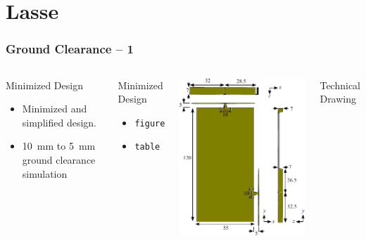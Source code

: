 \section{Lasse}

\begin{frame}[fragile]
    \frametitle{Ground Clearance -- 1}
    \begin{columns}[onlytextwidth,t]
        \begin{block}{Minimized Design}
          \begin{itemize}
          \item Minimized and simplified design.
            \item \SI{10}{mm} to \SI{5}{mm} ground clearance simulation
          \end{itemize}
        \end{block}
        \begin{block}{Minimized Design}
            \begin{itemize}
                \item \texttt{figure}
                \item \texttt{table}
            \end{itemize}
        \end{block}

        \begin{center}
            \includegraphics[scale=0.7]{img/Lasse/3d_drawing.pdf}
        \end{center}
        Technical Drawing
    \end{columns}
\end{frame}

